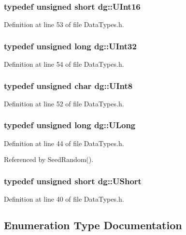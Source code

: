 \subsubsection{\setlength{\rightskip}{0pt plus 5cm}typedef unsigned short dg::UInt16}\label{namespacedg_a24}




Definition at line 53 of file Data\-Types.h.
\subsubsection{\setlength{\rightskip}{0pt plus 5cm}typedef unsigned long dg::UInt32}\label{namespacedg_a25}




Definition at line 54 of file Data\-Types.h.
\subsubsection{\setlength{\rightskip}{0pt plus 5cm}typedef unsigned char dg::UInt8}\label{namespacedg_a23}




Definition at line 52 of file Data\-Types.h.
\subsubsection{\setlength{\rightskip}{0pt plus 5cm}typedef unsigned long dg::ULong}\label{namespacedg_a17}




Definition at line 44 of file Data\-Types.h.

Referenced by Seed\-Random().
\subsubsection{\setlength{\rightskip}{0pt plus 5cm}typedef unsigned short dg::UShort}\label{namespacedg_a13}




Definition at line 40 of file Data\-Types.h.

\subsection{Enumeration Type Documentation}
